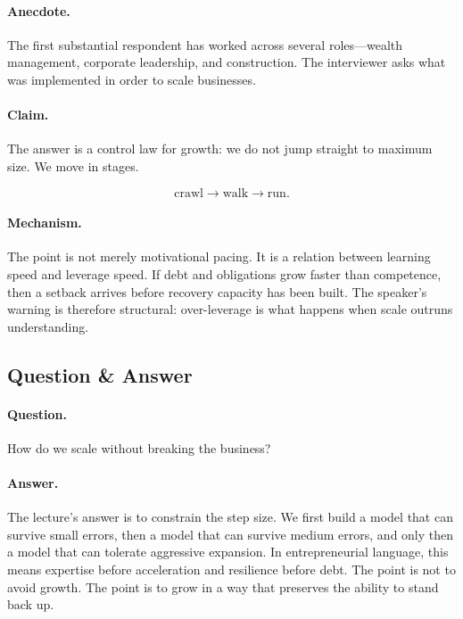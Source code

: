 \paragraph{Anecdote.}
The first substantial respondent has worked across several roles---wealth management, corporate leadership, and construction. The interviewer asks what was implemented in order to scale businesses.

\paragraph{Claim.}
The answer is a control law for growth: we do not jump straight to maximum size. We move in stages.

\begin{equation}
\text{crawl} \longrightarrow \text{walk} \longrightarrow \text{run}.
\end{equation}

\paragraph{Mechanism.}
The point is not merely motivational pacing. It is a relation between learning speed and leverage speed. If debt and obligations grow faster than competence, then a setback arrives before recovery capacity has been built. The speaker's warning is therefore structural: over-leverage is what happens when scale outruns understanding.

\subsection{Question \& Answer}

\paragraph{Question.}
How do we scale without breaking the business?

\paragraph{Answer.}
The lecture's answer is to constrain the step size. We first build a model that can survive small errors, then a model that can survive medium errors, and only then a model that can tolerate aggressive expansion. In entrepreneurial language, this means expertise before acceleration and resilience before debt. The point is not to avoid growth. The point is to grow in a way that preserves the ability to stand back up.


